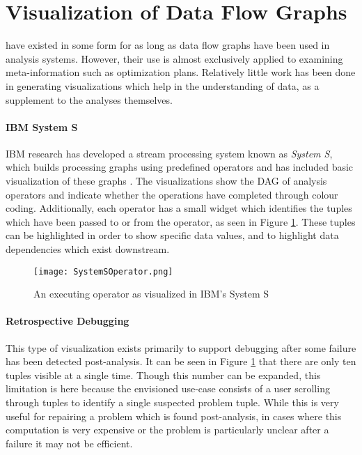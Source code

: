 \section{Visualization of Data Flow Graphs}
\label{sec:dfgviz}

 have existed in some form for as long as data flow graphs have been used in analysis systems. However, their use is almost exclusively applied to examining meta-information such as optimization plans. Relatively little work has been done in generating visualizations which help in the understanding of data, as a supplement to the analyses themselves.

\paragraph{IBM System S}
IBM research has developed a stream processing system known as \emph{System S}, which builds processing graphs using predefined operators \cite{Gedik2008} and has included basic visualization of these graphs \cite{Pauw2010}. The visualizations show the DAG of analysis operators and indicate whether the operations have completed through colour coding. Additionally, each operator has a small widget which identifies the tuples which have been passed to or from the operator, as seen in Figure \ref{fig:systemsop}. These tuples can be highlighted in order to show specific data values, and to highlight data dependencies which exist downstream.

\begin{figure}
	\centering
	\texttt{[image: SystemSOperator.png]}
	\caption{An executing operator as visualized in IBM's System S 
	\cite{Pauw2010}}
	\label{fig:systemsop}	
\end{figure}

\paragraph{Retrospective Debugging}
This type of visualization exists primarily to support debugging after some failure has been detected post-analysis. It can be seen in Figure \ref{fig:systemsop} that there are only ten tuples visible at a single time. Though this number can be expanded, this limitation is here because the envisioned use-case consists of a user scrolling through tuples to identify a single suspected problem tuple. While this is very useful for repairing a problem which is found post-analysis, in cases where this computation is very expensive or the problem is particularly unclear after a failure it may not be efficient. 

